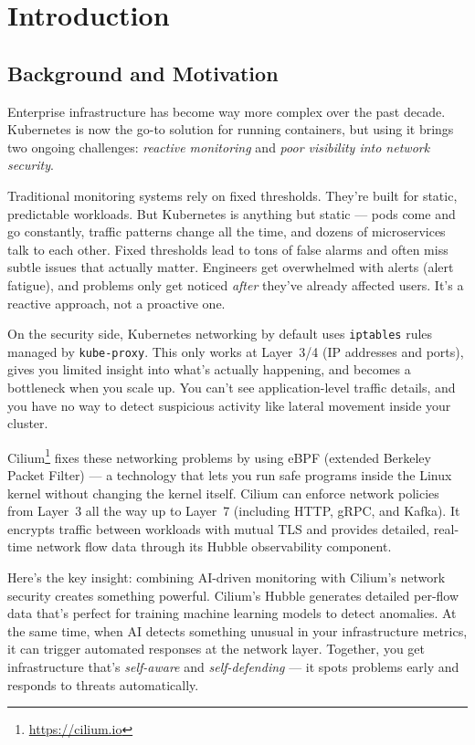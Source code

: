 \chapter{Introduction}
\label{chapter:introduction}

\section{Background and Motivation}

Enterprise infrastructure has become way more complex over the past decade. Kubernetes is now the go-to solution for running containers, but using it brings two ongoing challenges: \emph{reactive monitoring} and \emph{poor visibility into network security}.

Traditional monitoring systems rely on fixed thresholds. They're built for static, predictable workloads. But Kubernetes is anything but static — pods come and go constantly, traffic patterns change all the time, and dozens of microservices talk to each other. Fixed thresholds lead to tons of false alarms and often miss subtle issues that actually matter. Engineers get overwhelmed with alerts (alert fatigue), and problems only get noticed \emph{after} they've already affected users. It's a reactive approach, not a proactive one.

On the security side, Kubernetes networking by default uses \texttt{iptables} rules managed by \texttt{kube-proxy}. This only works at Layer~3/4 (IP addresses and ports), gives you limited insight into what's actually happening, and becomes a bottleneck when you scale up. You can't see application-level traffic details, and you have no way to detect suspicious activity like lateral movement inside your cluster.

Cilium\footnote{\url{https://cilium.io}} fixes these networking problems by using eBPF (extended Berkeley Packet Filter) — a technology that lets you run safe programs inside the Linux kernel without changing the kernel itself. Cilium can enforce network policies from Layer~3 all the way up to Layer~7 (including HTTP, gRPC, and Kafka). It encrypts traffic between workloads with mutual TLS and provides detailed, real-time network flow data through its Hubble observability component.

Here's the key insight: combining AI-driven monitoring with Cilium's network security creates something powerful. Cilium's Hubble generates detailed per-flow data that's perfect for training machine learning models to detect anomalies. At the same time, when AI detects something unusual in your infrastructure metrics, it can trigger automated responses at the network layer. Together, you get infrastructure that's \emph{self-aware} and \emph{self-defending} — it spots problems early and responds to threats automatically.

